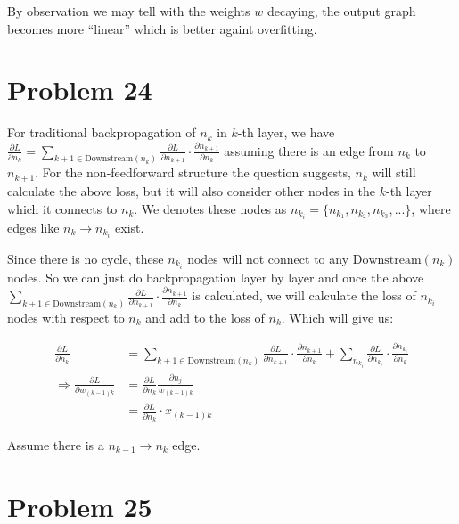 \documentclass[12pt]{article}
\newcommand{\p}{\partial}
\begin{document}
By observation we may tell with the weights $w$ decaying, the output graph becomes more ``linear'' which is better againt overfitting.

\section{Problem 24}


For traditional backpropagation of $n_k$ in $k$-th layer, we have $\frac{\p L}{\p n_k}  = \sum\limits_{k+1 \in \text{Downstream}(n_k)} \frac{\p L}{\p n_{k+1}} \cdot \frac{\p n_{k+1}}{\p n_k}$ assuming there is an edge from $n_k$ to $n_{k+1}$. For the non-feedforward structure the question suggests, $n_k$ will still calculate the above loss, but it will also consider other nodes in the $k$-th layer which it connects to $n_k$. We denotes these nodes as $n_{k_i} = \{n_{k_1}, n_{k_2}, n_{k_3}, ...\}$, where edges like $n_k \to n_{k_i}$ exist. \newline

Since there is no cycle, these $n_{k_i}$ nodes will not connect to any $\text{Downstream}(n_k)$ nodes. So we can just do backpropagation layer by layer and once the above $\sum\limits_{k+1 \in \text{Downstream}(n_k)} \frac{\p L}{\p n_{k+1}} \cdot \frac{\p n_{k+1}}{\p n_k}$ is calculated, we will calculate the loss of $n_{k_i}$ nodes with respect to $n_k$ and add to the loss of $n_k$. Which will give us:

\begin{align*}
    \frac{\p L}{\p n_k}  &= \sum\limits_{k+1 \in \text{Downstream}(n_k)} \frac{\p L}{\p n_{k+1}} \cdot \frac{\p n_{k+1}}{\p n_k} + \sum\limits_{n_{k_i}} \frac{\p L}{\p n_{k_i}} \cdot \frac{\p n_{k_i}}{\p n_k} \\
    \Longrightarrow \frac{\p L}{\p w_{(k-1)k}} &= \frac{\p L}{\p n_k} \frac{\p n_j}{w_{(k-1)k}} \\
    &= \frac{\p L}{\p n_k} \cdot x_{(k-1)k}
\end{align*}

Assume there is a $n_{k-1} \to n_k$ edge.

\section{Problem 25}
\end{document}
